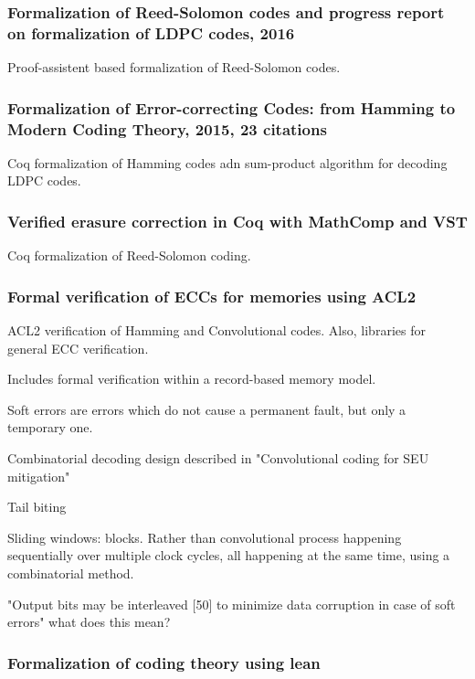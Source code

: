 \documentclass{article}
\begin{document}
\subsubsection{Formalization of Reed-Solomon codes and progress report on formalization of LDPC codes, 2016}

Proof-assistent based formalization of Reed-Solomon codes.

\subsubsection{Formalization of Error-correcting Codes: from Hamming to Modern Coding Theory, 2015, 23 citations}

Coq formalization of Hamming codes adn sum-product algorithm for decoding LDPC codes.

\subsubsection{Verified erasure correction in Coq with MathComp and VST}

Coq formalization of Reed-Solomon coding.

\subsubsection{Formal verification of ECCs for memories using ACL2}

ACL2 verification of Hamming and Convolutional codes. Also, libraries for general ECC verification.

Includes formal verification within a record-based memory model.

Soft errors are errors which do not cause a permanent fault, but only a temporary one.

Combinatorial decoding design described in "Convolutional coding for SEU mitigation"
 
Tail biting

Sliding windows: blocks. Rather than convolutional process happening sequentially over multiple clock cycles, all happening at the same time, using a combinatorial method.

"Output bits may be interleaved [50] to minimize data corruption in case of soft errors" what does this mean?

\subsubsection{Formalization of coding theory using lean}
\end{document}
